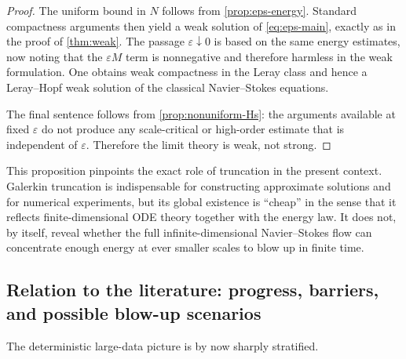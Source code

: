 \documentclass[11pt]{article}
\theoremstyle{definition}
\theoremstyle{remark}
\begin{document}
\begin{proof}
The uniform bound in $N$ follows from \cref{prop:eps-energy}. Standard compactness arguments then yield a weak solution of \eqref{eq:eps-main}, exactly as in the proof of \cref{thm:weak}. The passage $\varepsilon\downarrow0$ is based on the same energy estimates, now noting that the $\varepsilon M$ term is nonnegative and therefore harmless in the weak formulation. One obtains weak compactness in the Leray class and hence a Leray--Hopf weak solution of the classical Navier--Stokes equations.

The final sentence follows from \cref{prop:nonuniform-Hs}: the arguments available at fixed $\varepsilon$ do not produce any scale-critical or high-order estimate that is independent of $\varepsilon$. Therefore the limit theory is weak, not strong.
\end{proof}

This proposition pinpoints the exact role of truncation in the present context. Galerkin truncation is indispensable for constructing approximate solutions and for numerical experiments, but its global existence is ``cheap'' in the sense that it reflects finite-dimensional ODE theory together with the energy law. It does not, by itself, reveal whether the full infinite-dimensional Navier--Stokes flow can concentrate enough energy at ever smaller scales to blow up in finite time.

\subsection{Relation to the literature: progress, barriers, and possible blow-up scenarios}

The deterministic large-data picture is by now sharply stratified.
\end{document}
